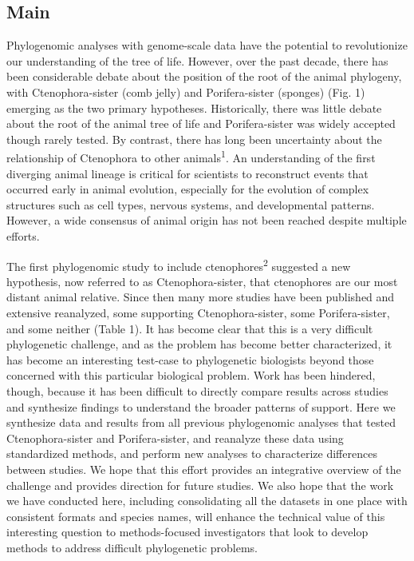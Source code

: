 \documentclass[]{article}
\begin{document}
\hypertarget{main}{%
\subsection{Main}\label{main}}

Phylogenomic analyses with genome-scale data have the potential to
revolutionize our understanding of the tree of life. However, over the
past decade, there has been considerable debate about the position of
the root of the animal phylogeny, with Ctenophora-sister (comb jelly)
and Porifera-sister (sponges) (Fig. 1) emerging as the two primary
hypotheses. Historically, there was little debate about the root of the
animal tree of life and Porifera-sister was widely accepted though
rarely tested. By contrast, there has long been uncertainty about the
relationship of Ctenophora to other animals\textsuperscript{1}. An
understanding of the first diverging animal lineage is critical for
scientists to reconstruct events that occurred early in animal
evolution, especially for the evolution of complex structures such as
cell types, nervous systems, and developmental patterns. However, a wide
consensus of animal origin has not been reached despite multiple
efforts.

The first phylogenomic study to include ctenophores\textsuperscript{2}
suggested a new hypothesis, now referred to as Ctenophora-sister, that
ctenophores are our most distant animal relative. Since then many more
studies have been published and extensive reanalyzed, some supporting
Ctenophora-sister, some Porifera-sister, and some neither (Table 1). It
has become clear that this is a very difficult phylogenetic challenge,
and as the problem has become better characterized, it has become an
interesting test-case to phylogenetic biologists beyond those concerned
with this particular biological problem. Work has been hindered, though,
because it has been difficult to directly compare results across studies
and synthesize findings to understand the broader patterns of support.
Here we synthesize data and results from all previous phylogenomic
analyses that tested Ctenophora-sister and Porifera-sister, and
reanalyze these data using standardized methods, and perform new
analyses to characterize differences between studies. We hope that this
effort provides an integrative overview of the challenge and provides
direction for future studies. We also hope that the work we have
conducted here, including consolidating all the datasets in one place
with consistent formats and species names, will enhance the technical
value of this interesting question to methods-focused investigators that
look to develop methods to address difficult phylogenetic problems.
\end{document}

